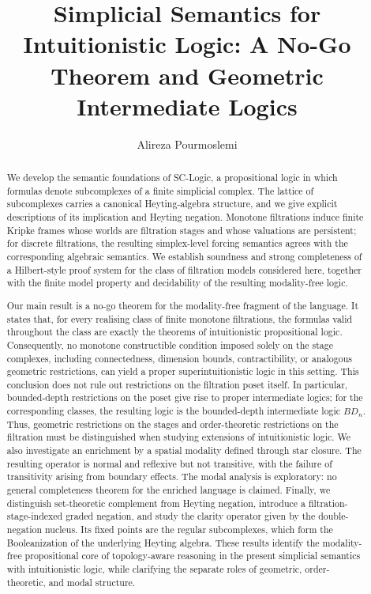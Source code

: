 \documentclass[final,12pt]{elsarticle}
\theoremstyle{plain}
\theoremstyle{definition}
\begin{document}
\begin{frontmatter}
\title{Simplicial Semantics for Intuitionistic Logic: A No-Go Theorem and Geometric Intermediate Logics}
\author{Alireza Pourmoslemi}
\address{Department of Mathematics, Payame Noor University, Tehran, Iran}

\begin{abstract}
We develop the semantic foundations of SC-Logic, a propositional logic in which formulas denote subcomplexes of a finite simplicial complex. The lattice of subcomplexes carries a canonical Heyting-algebra structure, and we give explicit descriptions of its implication and Heyting negation. Monotone filtrations induce finite Kripke frames whose worlds are filtration stages and whose valuations are persistent; for discrete filtrations, the resulting simplex-level forcing semantics agrees with the corresponding algebraic semantics. We establish soundness and strong completeness of a Hilbert-style proof system for the class of filtration models considered here, together with the finite model property and decidability of the resulting modality-free logic.

Our main result is a no-go theorem for the modality-free fragment of the
language. It states that, for every realising class of finite monotone
filtrations, the formulas valid throughout the class are exactly the
theorems of intuitionistic propositional logic. Consequently, no monotone
constructible condition imposed solely on the stage complexes, including
connectedness, dimension bounds, contractibility, or analogous geometric
restrictions, can yield a proper superintuitionistic logic in this setting.
This conclusion does not rule out restrictions on the filtration poset
itself. In particular, bounded-depth restrictions on the poset give rise to
proper intermediate logics; for the corresponding classes, the resulting
logic is the bounded-depth intermediate logic \(BD_n\). Thus, geometric
restrictions on the stages and order-theoretic restrictions on the
filtration must be distinguished when studying extensions of intuitionistic
logic.
We also investigate an enrichment by a spatial modality defined through star closure. The resulting operator is normal and reflexive but not transitive, with the failure of transitivity arising from boundary effects. The modal analysis is exploratory: no general completeness theorem for the enriched language is claimed. Finally, we distinguish set-theoretic complement from Heyting negation, introduce a filtration-stage-indexed graded negation, and study the clarity operator given by the double-negation nucleus. Its fixed points are the regular subcomplexes, which form the Booleanization of the underlying Heyting algebra. These results identify the modality-free propositional core of topology-aware reasoning in the present simplicial semantics with intuitionistic logic, while clarifying the separate roles of geometric, order-theoretic, and modal structure.
\end{abstract}


\end{frontmatter}
\end{document}
